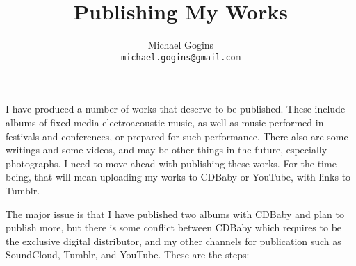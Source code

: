 \documentclass[english,11pt,letterpaper,onecolumn]{scrartcl}
\begin{document}
\title{Publishing My Works}
\author{Michael Gogins \\ \texttt{michael.gogins@gmail.com}}
\maketitle


I have produced a number of works that deserve to be published. These include albums of fixed media electroacoustic music, as well as music performed in festivals and conferences, or prepared for such performance. There also are some writings and some videos, and may be other things in the future, especially photographs. I need to move ahead with publishing these works. For the time being, that will mean uploading my works to CDBaby or YouTube, with links to Tumblr.


The major issue is that I have published two albums with CDBaby and plan to publish more, but there is some conflict between CDBaby which requires to be the exclusive digital distributor, and my other channels for publication such as SoundCloud, Tumblr, and YouTube. These are the steps:
\end{document}
